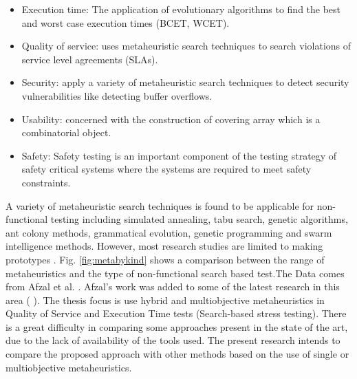 \documentclass[espaco=umemeio,chapter=TITLE,twoside,openright]{abnt}
\begin{document}
\begin{itemize}
\item Execution time: The application of evolutionary algorithms to find the best and worst case execution times (BCET, WCET).
\item Quality of service: uses metaheuristic search techniques to search violations of service level agreements (SLAs).
\item Security: apply a variety of metaheuristic search techniques to detect security vulnerabilities like detecting buffer overflows.
\item Usability: concerned with the construction of covering array which is a combinatorial object.
\item Safety: Safety testing is an important component of the testing strategy of safety critical systems where the systems are required to meet safety constraints.
\end{itemize}

A variety of metaheuristic search techniques is found to be applicable for non-functional testing including simulated annealing, tabu search, genetic algorithms, ant colony methods, grammatical evolution, genetic programming and swarm intelligence methods. However, most research studies are limited to making prototypes \cite{Afzal2009a}.  Fig. \ref{fig:metabykind} shows a comparison between the range of metaheuristics and the type of non-functional search based test.The Data comes from Afzal et al. \cite{Afzal2009a}. Afzal's work was added to some of the latest research in this area (\cite{Garousi2006} \cite{Garousi2010} \cite{DiAlesio2013} \cite{DiAlesio2014} \cite{Alesio2015} \cite{Gois2016}). The thesis focus is use  hybrid and multiobjective metaheuristics in Quality of Service and Execution Time tests (Search-based stress testing). There is a great difficulty in
comparing some approaches present in the state of
the art, due to the lack of availability of the tools used. The present research intends to compare the proposed approach with other methods based on the use of single or multiobjective metaheuristics. 
\end{document}

